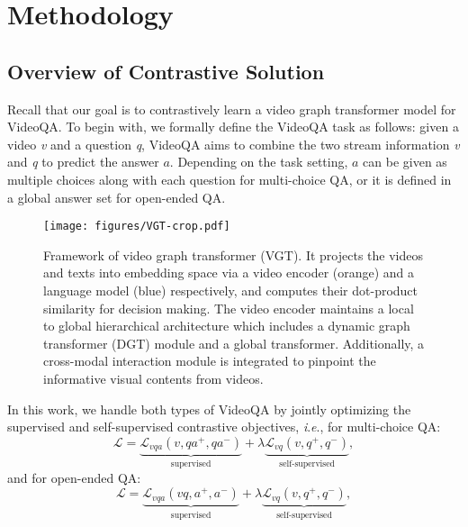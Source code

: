 \documentclass[10pt,journal,compsoc]{IEEEtran}
\newcommand{\ie}{\textit{i}.\textit{e}.}
\begin{document}
 \section{Methodology}
\label{sec:method}
\subsection{Overview of Contrastive Solution}
Recall that our goal is to contrastively learn a video graph transformer model for VideoQA. To begin with, 
we formally define the VideoQA task as follows: given a video \textit{v} and a question \textit{q}, VideoQA aims to combine the two stream information \textit{v} and \textit{q} to predict the answer \textit{$a$}. Depending on the task setting, \textit{$a$} can be given as multiple choices along with each question for multi-choice QA, or it is defined in a global answer set for open-ended QA. 
\begin{figure}[t]
  \begin{center}
    \texttt{[image: figures/VGT-crop.pdf]}
  \end{center}
  \vspace{-0.3cm}
  \caption{Framework of video graph transformer (VGT). It projects the videos and texts into embedding space via a video encoder (orange) and a language model (blue) respectively, and computes their dot-product similarity for decision making. The video encoder maintains a local to global hierarchical architecture which includes a dynamic graph transformer (DGT) module and a global transformer. Additionally, a cross-modal interaction module is integrated to pinpoint the informative visual contents from videos.}
  \vspace{-0.4cm}
  \label{fig:framework}
\end{figure}

In this work, we handle both types of VideoQA by jointly optimizing the supervised and self-supervised contrastive objectives, \ie, for multi-choice QA:
\begin{equation}\label{eq:obj-mc}
    \mathcal{L} = \underbrace{\mathcal{L}_{vqa}(v, qa^+, qa^-)}_{\text{supervised}} + \lambda \underbrace{\mathcal{L}_{vq}(v, q^+, q^-)}_{\text{self-supervised}},
\end{equation}
and for open-ended QA:
\begin{equation}\label{eq:obj-oe}
    \mathcal{L} = \underbrace{\mathcal{L}_{vqa}(vq, a^+, a^-)}_{\text{supervised}} + \lambda \underbrace{\mathcal{L}_{vq}(v, q^+, q^-)}_{\text{self-supervised}},
\end{equation}
\end{document}
